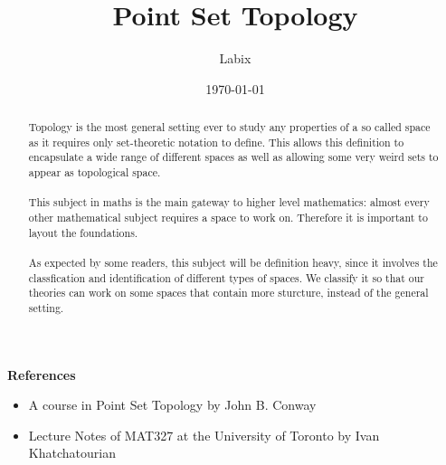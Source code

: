 \documentclass[a4paper]{article}
\title{Point Set Topology}
\author{Labix}
\date{\today}
\begin{document}
\maketitle
\begin{abstract}
Topology is the most general setting ever to study any properties of a so called space as it requires only set-theoretic notation to define. This allows this definition to encapsulate a wide range of different spaces as well as allowing some very weird sets to appear as topological space. \\~\\
This subject in maths is the main gateway to higher level mathematics: almost every other mathematical subject requires a space to work on. Therefore it is important to layout the foundations. \\~\\
As expected by some readers, this subject will be definition heavy, since it involves the classfication and identification of different types of spaces. We classify it so that our theories can work on some spaces that contain more sturcture, instead of the general setting. 
\end{abstract}
\textbf{References}
\begin{itemize}
\item A course in Point Set Topology by John B. Conway
\item Lecture Notes of MAT327 at the University of Toronto by Ivan Khatchatourian
\end{itemize}
\pagebreak
\tableofcontents
\pagebreak

\end{document}
